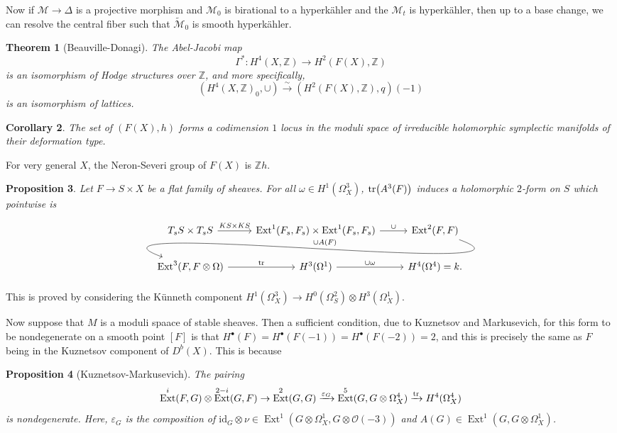 \documentclass[leqno, openany]{memoir}
\newtheorem{thm}{Theorem}[section]
\newtheorem{cor}[thm]{Corollary}
\newtheorem{prop}[thm]{Proposition}
\theoremstyle{definition}
\theoremstyle{remark}
\theoremstyle{plain}
\theoremstyle{definition}
\theoremstyle{remark}
\newcommand{\Z}{\mathbb{Z}}
\newcommand{\ep}{\varepsilon}
\newcommand{\mc}[1]{\mathcal{#1}}
\newcommand{\mr}[1]{\mathrm{#1}}
\newcommand{\wt}[1]{\widetilde{#1}}
\DeclareMathOperator{\Ext}{Ext}
\begin{document}
Now if $\mc{M} \to \Delta$ is a projective morphism and $\mc{M}_0$ is birational to a hyperk\"ahler and the $\mc{M}_t$ is hyperk\"ahler, then up to a base change, we can resolve the central fiber such that $\wt{\mc{M}}_0$ is smooth hyperk\"ahler.

\begin{thm}[Beauville-Donagi]
    The Abel-Jacobi map
    \[ \Gamma^* \colon H^4(X, \Z) \to H^2(F(X), \Z) \]
    is an isomorphism of Hodge structures over $\Z$, and more specifically, 
    \[ (H^4(X, \Z)_0, \cup) \xrightarrow{\sim} (H^2(F(X), \Z), q)(-1) \]
    is an isomorphism of lattices.
\end{thm}

\begin{cor}
    The set of $(F(X), h)$ forms a codimension $1$ locus in the moduli space of irreducible holomorphic symplectic manifolds of their deformation type.
\end{cor}

For very general $X$, the Neron-Severi group of $F(X)$ is $\Z h$.

\begin{prop}
    Let $F \to S \times X$ be a flat family of sheaves. For all $\omega \in H^1(\Omega_X^3)$, $\tr(A^3(F))$ induces a holomorphic $2$-form on $S$ which pointwise is
    \begin{equation*}
    \begin{tikzcd}
        T_s S \times T_s S \ar{r}{KS \times KS} & \Ext^1(F_s, F_s) \times \Ext^1(F_s, F_s) \ar{r}{\cup} & \Ext^2(F, F) \ar[in=160,out=-20,swap]{dll}{\cup A(F)} & \\
        \Ext^3(F, F \otimes \Omega) \ar{r}{\tr} & H^3(\Omega^1) \ar{r}{\cup \omega} & H^4(\Omega^4) = k.
    \end{tikzcd}
    \end{equation*}
\end{prop}

This is proved by considering the K\"unneth component $H^1(\Omega^3_X) \to H^0(\Omega^2_S) \otimes H^3(\Omega^1_X)$.

Now suppose that $M$ is a moduli spaace of stable sheaves. Then a sufficient condition, due to Kuznetsov and Markusevich, for this form to be nondegenerate on a smooth point $[F]$ is that $H^{\bullet}(F) = H^{\bullet}(F(-1)) = H^{\bullet}(F(-2)) = 2$, and this is precisely the same as $F$ being in the Kuznetsov component of $D^b(X)$. This is because
\begin{prop}[Kuznetsov-Markusevich]
    The pairing
    \[ \Ext^i(F, G) \otimes \Ext^{2-i}(G, F) \to \Ext^2(G, G) \xrightarrow{\ep_G} \Ext^5(G, G \otimes \Omega_X^4) \xrightarrow{\tr} H^4(\Omega^4_X) \]
    is nondegenerate. Here, $\ep_G$ is the composition of $\mr{id}_G \otimes \nu \in \Ext^1(G \otimes \Omega^1_X, G \otimes \mc{O}(-3))$ and $A(G) \in \Ext^1(G, G \otimes \Omega^1_X)$.
\end{prop}
\end{document}
